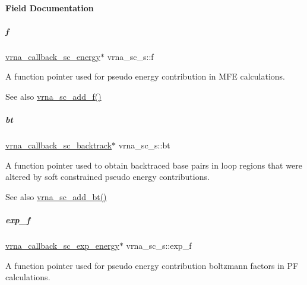 \paragraph{Field Documentation}
\mbox{\label{group__soft__constraints_a32dc86090237888c75491bbd4861a04b}} 
\subparagraph{\texorpdfstring{f}{f}}
{\footnotesize\ttfamily \mbox{\hyperlink{group__soft__constraints_ga88a266695d9e25cc12114dceb7b4565e}{vrna\+\_\+callback\+\_\+sc\+\_\+energy}}$\ast$ vrna\+\_\+sc\+\_\+s\+::f}



A function pointer used for pseudo energy contribution in M\+FE calculations. 

\begin{DoxySeeAlso}{See also}
\mbox{\hyperlink{group__soft__constraints_ga8c7d907ec0125cd61c04e0908010a4e9}{vrna\+\_\+sc\+\_\+add\+\_\+f()}} 
\end{DoxySeeAlso}
\mbox{\label{group__soft__constraints_a2a2aca01782c2b980d7b7fd05b9be89c}} 
\subparagraph{\texorpdfstring{bt}{bt}}
{\footnotesize\ttfamily \mbox{\hyperlink{group__soft__constraints_gaeb6448da6c593d4c489c7fbadcb99499}{vrna\+\_\+callback\+\_\+sc\+\_\+backtrack}}$\ast$ vrna\+\_\+sc\+\_\+s\+::bt}



A function pointer used to obtain backtraced base pairs in loop regions that were altered by soft constrained pseudo energy contributions. 

\begin{DoxySeeAlso}{See also}
\mbox{\hyperlink{group__soft__constraints_gabde7d07a79bb9a8f4721aee247b674ea}{vrna\+\_\+sc\+\_\+add\+\_\+bt()}} 
\end{DoxySeeAlso}
\mbox{\label{group__soft__constraints_a0de08a09f3ccf2f97974d23192668ab0}} 
\subparagraph{\texorpdfstring{exp\_f}{exp\_f}}
{\footnotesize\ttfamily \mbox{\hyperlink{group__soft__constraints_ga4099978d410513edeeff8f3db13144c5}{vrna\+\_\+callback\+\_\+sc\+\_\+exp\+\_\+energy}}$\ast$ vrna\+\_\+sc\+\_\+s\+::exp\+\_\+f}



A function pointer used for pseudo energy contribution boltzmann factors in PF calculations. 

